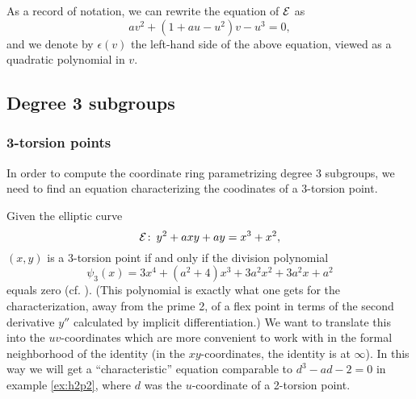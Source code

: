 \documentclass{gtpart}
\theoremstyle{definition}
\theoremstyle{remark}
\def\co{\colon\thinspace}
\begin{document}
As a record of notation, we can rewrite the equation of $\cal E$ as 
\[
 a v^2 + (1 + a u - u^2) v - u^3 = 0,
\]
and we denote by $\epsilon(v)$ the left-hand side of the above equation, viewed as a quadratic polynomial in $v$.  


\subsection{Degree 3 subgroups}
\label{subsec:step2}

\subsubsection{3-torsion points}
\label{subsec}

In order to compute the coordinate ring parametrizing degree 3 subgroups, we need to find an equation characterizing the coodinates of a 3-torsion point.  

Given the elliptic curve 
\[
 {\cal E}\co y^2 + a x y + a y = x^3 + x^2,
\]
$(x,y)$ is a 3-torsion point if and only if the division polynomial 
\[
 \psi_3 (x) = 3x^4 + (a^2 + 4) x^3 + 3a^2 x^2 + 3a^2 x + a^2 
\]
equals zero (cf. \cite[exercise 3.7(d)]{AEC}).  
(This polynomial is exactly what one gets for the characterization, away 
from the prime 2, of a flex point in terms of the second derivative $y''$ 
calculated by implicit differentiation.)  We want to translate this into 
the $uv$-coordinates which are more convenient to work with 
in the formal neighborhood of the identity (in the $xy$-coordinates, the 
identity is at $\infty$). In this way we will get a ``characteristic'' equation 
comparable to $d^3 - a d - 2 = 0$ in example \ref{ex:h2p2}, where $d$ was 
the $u$-coordinate of a 2-torsion point.  
\end{document}
